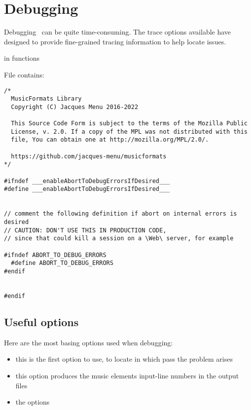

\chapter{Debugging}

Debugging \mf\ can be quite time-consuming. The trace options available have designed to provide fine-grained tracing information to help locate issues.

 in  functions

File  contains:
\begin{lstlisting}[language=CPlusPlus]
/*
  MusicFormats Library
  Copyright (C) Jacques Menu 2016-2022

  This Source Code Form is subject to the terms of the Mozilla Public
  License, v. 2.0. If a copy of the MPL was not distributed with this
  file, You can obtain one at http://mozilla.org/MPL/2.0/.

  https://github.com/jacques-menu/musicformats
*/

#ifndef ___enableAbortToDebugErrorsIfDesired___
#define ___enableAbortToDebugErrorsIfDesired___


// comment the following definition if abort on internal errors is desired
// CAUTION: DON'T USE THIS IN PRODUCTION CODE,
// since that could kill a session on a \Web\ server, for example

#ifndef ABORT_TO_DEBUG_ERRORS
  #define ABORT_TO_DEBUG_ERRORS
#endif


#endif
\end{lstlisting}


\section{Useful options}

Here are the most basing options used when debugging:
\begin{itemize}
\item {}
	this is the first option to use, to locate in which pass the problem arises

\item {}
	this option produces the music elements input-line numbers in the output files

\item the  options

\end{itemize}
